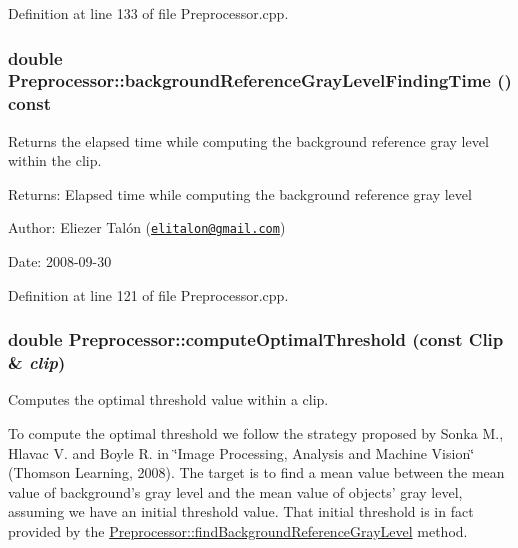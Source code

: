 Definition at line 133 of file Preprocessor.cpp.\hypertarget{class_preprocessor_3189cad5515476d54cc14effcf983fc7}{
\subsubsection[backgroundReferenceGrayLevelFindingTime]{\setlength{\rightskip}{0pt plus 5cm}double Preprocessor::backgroundReferenceGrayLevelFindingTime () const}}
\label{class_preprocessor_3189cad5515476d54cc14effcf983fc7}


Returns the elapsed time while computing the background reference gray level within the clip. 

\begin{Desc}
\item[Returns:]Elapsed time while computing the background reference gray level\end{Desc}
\begin{Desc}
\item[Author:]Eliezer Talón (\href{mailto:elitalon@gmail.com}{\tt elitalon@gmail.com}) \end{Desc}
\begin{Desc}
\item[Date:]2008-09-30 \end{Desc}


Definition at line 121 of file Preprocessor.cpp.\hypertarget{class_preprocessor_2fbe202fbf9e7ef8f9951a24a3156230}{
\subsubsection[computeOptimalThreshold]{\setlength{\rightskip}{0pt plus 5cm}double Preprocessor::computeOptimalThreshold (const {\bf Clip} \& {\em clip})}}
\label{class_preprocessor_2fbe202fbf9e7ef8f9951a24a3156230}


Computes the optimal threshold value within a clip. 

To compute the optimal threshold we follow the strategy proposed by Sonka M., Hlavac V. and Boyle R. in \char`\"{}Image Processing, Analysis and Machine Vision\char`\"{} (Thomson Learning, 2008). The target is to find a mean value between the mean value of background's gray level and the mean value of objects' gray level, assuming we have an initial threshold value. That initial threshold is in fact provided by the \hyperlink{class_preprocessor_1cd0543e1e41124a9dd26c99036ac62d}{Preprocessor::findBackgroundReferenceGrayLevel} method.

